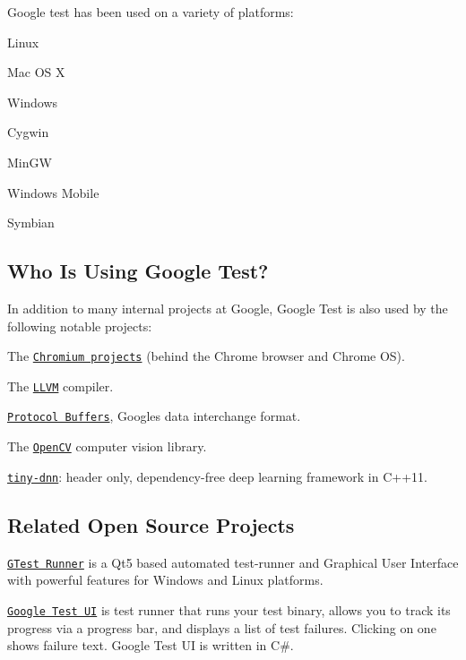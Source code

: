Google test has been used on a variety of platforms\+:


\begin{DoxyItemize}
\item Linux
\item Mac OS X
\item Windows
\item Cygwin
\item Min\+GW
\item Windows Mobile
\item Symbian
\end{DoxyItemize}

\subsection*{Who Is Using Google Test?}

In addition to many internal projects at Google, Google Test is also used by the following notable projects\+:


\begin{DoxyItemize}
\item The \href{http://www.chromium.org/}{\tt Chromium projects} (behind the Chrome browser and Chrome OS).
\item The \href{http://llvm.org/}{\tt L\+L\+VM} compiler.
\item \href{https://github.com/google/protobuf}{\tt Protocol Buffers}, Google\textquotesingle{}s data interchange format.
\item The \href{http://opencv.org/}{\tt Open\+CV} computer vision library.
\item \href{https://github.com/tiny-dnn/tiny-dnn}{\tt tiny-\/dnn}\+: header only, dependency-\/free deep learning framework in C++11.
\end{DoxyItemize}

\subsection*{Related Open Source Projects}

\href{https://github.com/nholthaus/gtest-runner}{\tt G\+Test Runner} is a Qt5 based automated test-\/runner and Graphical User Interface with powerful features for Windows and Linux platforms.

\href{https://github.com/ospector/gtest-gbar}{\tt Google Test UI} is test runner that runs your test binary, allows you to track its progress via a progress bar, and displays a list of test failures. Clicking on one shows failure text. Google Test UI is written in C\#.

